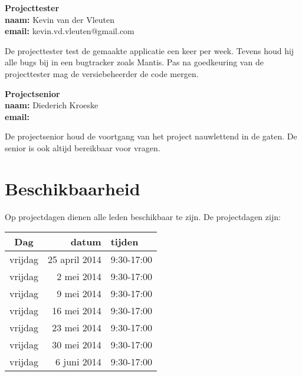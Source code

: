 \bigskip
\textbf{Projecttester}\\
\textbf{naam:}	Kevin van der Vleuten\\
\textbf{email:}	kevin.vd.vleuten@gmail.com

\bigskip
De projecttester test de gemaakte applicatie een keer per week. Tevens houd hij alle bugs bij in een bugtracker zoals Mantis. Pas na goedkeuring van de projecttester mag de versiebeheerder de code mergen.

\bigskip
\textbf{Projectsenior}\\
\textbf{naam:}	Diederich Kroeske\\
\textbf{email:}

\bigskip
De projectsenior houd de voortgang van het project nauwlettend in de gaten. De senior is ook altijd bereikbaar voor vragen.

\section{Beschikbaarheid} \label{sec:typesetting}
Op projectdagen dienen alle leden beschikbaar te zijn. De projectdagen zijn:
\begin{table}[h]
  \label{tb:table}
  \begin{tabular}{crl}
    \toprule
    Dag     & 			datum & 		tijden    \\
    \midrule
    vrijdag     & 25 	april 	2014   & 9:30-17:00\\
    vrijdag     & 2 	mei 	2014   & 9:30-17:00\\
    vrijdag     & 9 	mei 	2014   & 9:30-17:00\\
    vrijdag     & 16 	mei 	2014   & 9:30-17:00\\
    vrijdag     & 23 	mei 	2014   & 9:30-17:00\\
    vrijdag     & 30 	mei 	2014   & 9:30-17:00\\
    vrijdag     & 6 	juni 	2014   & 9:30-17:00\\
    \bottomrule
  \end{tabular}
\end{table}